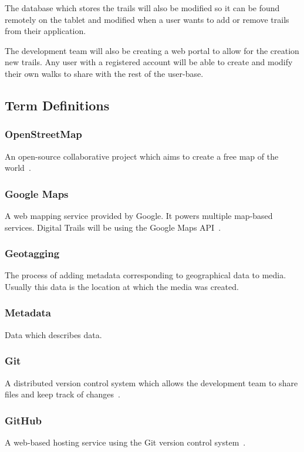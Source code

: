 \documentclass[11pt,a4paper]{article}
\begin{document}
The database which stores the trails will also be modified so it can be found remotely on the tablet and modified when a user wants to add or remove trails from their application.

The development team will also be creating a web portal to allow for the creation new trails. Any user with a registered account will be able to create and modify their own walks to share with the rest of the user-base.

\subsection{Term Definitions}
\label{sec:terms}

\subsubsection{OpenStreetMap}
An open-source collaborative project which aims to create a free map of the world~\cite{OSM}.

\subsubsection{Google Maps}
A web mapping service provided by Google. It powers multiple map-based services. Digital Trails will be using the Google Maps API~\cite{googleAPI}.

\subsubsection{Geotagging}
The process of adding metadata corresponding to geographical data to media. Usually this data is the location at which the media was created.

\subsubsection{Metadata}
Data which describes data.

\subsubsection{Git}
A distributed version control system which allows the development team to share files and keep track of changes~\cite{git}.

\subsubsection{GitHub}
A web-based hosting service using the Git version control system~\cite{github}.
\end{document}
